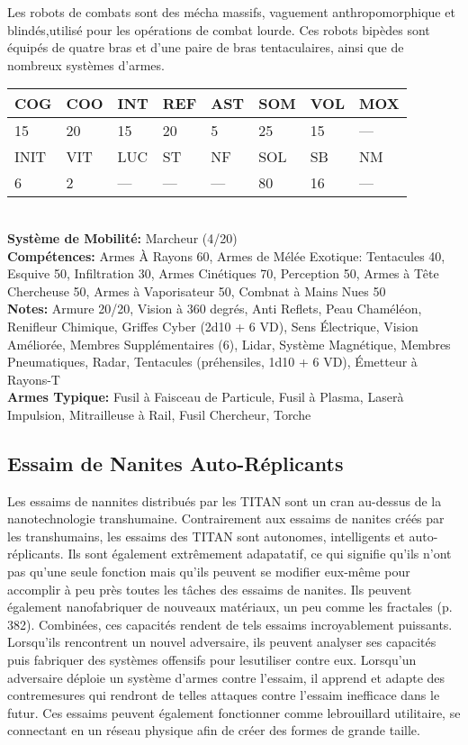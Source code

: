 Les robots de combats sont des mécha massifs, vaguement anthropomorphique et blindés,utilisé pour les opérations de combat lourde. Ces robots bipèdes sont équipés de quatre bras et d'une paire de bras tentaculaires, ainsi que de nombreux systèmes d'armes. \\ \begin{tabular}{|l|l|l|l|l|l|l|l|} \hline

COG &COO &INT &REF &AST &SOM &VOL &MOX \\ \hline

15 &20 &15 &20 &5 &25 &15 &— \\ \hline

INIT &VIT &LUC &ST &NF &SOL &SB &NM \\ \hline

6 &2 &— &— &— &80 &16 &— \\ \hline

\end{tabular} \\ \textbf{Système de Mobilité: }Marcheur (4/20) \\ \textbf{Compétences:} Armes À Rayons 60, Armes de Mélée Exotique: Tentacules 40, Esquive 50, Infiltration 30, Armes Cinétiques 70, Perception 50, Armes à Tête Chercheuse 50, Armes à Vaporisateur 50, Combnat à Mains Nues 50 \\ \textbf{Notes:} Armure 20/20, Vision à 360 degrés, Anti Reflets, Peau Chaméléon, Renifleur Chimique, Griffes Cyber (2d10 + 6 VD), Sens Électrique, Vision Améliorée, Membres Supplémentaires (6), Lidar, Système Magnétique, Membres Pneumatiques, Radar, Tentacules (préhensiles, 1d10 + 6 VD), Émetteur à Rayons-T\\ \textbf{Armes Typique:} Fusil à Faisceau de Particule, Fusil à Plasma, Laserà Impulsion, Mitrailleuse à Rail, Fusil Chercheur, Torche 

\subsection{Essaim de Nanites Auto-Réplicants} 

Les essaims de nannites distribués par les TITAN sont un cran au-dessus de la nanotechnologie transhumaine. Contrairement aux essaims de nanites créés par les transhumains, les essaims des TITAN sont autonomes, intelligents et auto-réplicants. Ils sont également extrêmement adapatatif, ce qui signifie qu'ils n'ont pas qu'une seule fonction mais qu'ils peuvent se modifier eux-même pour accomplir à peu près toutes les tâches des essaims de nanites. Ils peuvent également nanofabriquer de nouveaux matériaux, un peu comme les fractales (p. 382). Combinées, ces capacités rendent de tels essaims incroyablement puissants. Lorsqu'ils rencontrent un nouvel adversaire, ils peuvent analyser ses capacités puis fabriquer des systèmes offensifs pour lesutiliser contre eux. Lorsqu'un adversaire déploie un système d'armes contre l'essaim, il apprend et adapte des contremesures qui rendront de telles attaques contre l'essaim inefficace dans le futur. Ces essaims peuvent également fonctionner comme lebrouillard utilitaire, se connectant en un réseau physique afin de créer des formes de grande taille. 

